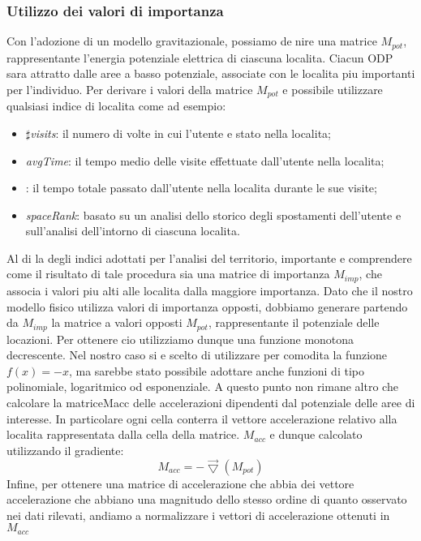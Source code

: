 \subsubsection{Utilizzo dei valori di importanza}
Con l'adozione di un modello gravitazionale, possiamo denire una matrice
$M_{pot}$, rappresentante l'energia potenziale elettrica di ciascuna localita. Ciacun
ODP sara attratto dalle aree a basso potenziale, associate con le localita piu
importanti per l'individuo.
Per derivare i valori della matrice $M_{pot}$ e possibile utilizzare qualsiasi indice di
localita come ad esempio:
\begin{itemize}
\item $\sharp$\textit{visits}: il numero di volte in cui l'utente e stato nella localita;
\item \textit{avgTime}: il tempo medio delle visite effettuate dall'utente nella localita;
\item {}: il tempo totale passato dall'utente nella localita durante le sue
visite;
\item \textit{spaceRank}: basato su un analisi dello storico degli spostamenti dell'utente
e sull'analisi dell'intorno di ciascuna localita.
\end{itemize}
Al di la degli indici adottati per l'analisi del territorio, importante e comprendere
come il risultato di tale procedura sia una matrice di importanza
$M_{imp}$, che associa i valori piu alti alle localita dalla maggiore importanza. Dato
che il nostro modello fisico utilizza valori di importanza opposti, dobbiamo
generare partendo da $M_{imp}$ la matrice a valori opposti $M_{pot}$, rappresentante il
potenziale delle locazioni. Per ottenere cio utilizziamo dunque una funzione
monotona decrescente. Nel nostro caso si e scelto di utilizzare per comodita
la funzione $f(x)=-x$, ma sarebbe stato possibile adottare anche funzioni di tipo
polinomiale, logaritmico od esponenziale. A questo punto non rimane altro che
calcolare la matriceMacc delle accelerazioni dipendenti dal potenziale delle aree
di interesse. In particolare ogni cella conterra il vettore accelerazione relativo
alla localita rappresentata dalla cella della matrice. $M_{acc}$ e dunque calcolato
utilizzando il gradiente:
\begin{equation}
M_{acc} = - \vec{\bigtriangledown}(M_{pot})
\end{equation}
Infine, per ottenere una matrice di accelerazione che abbia dei vettore accelerazione
che abbiano una magnitudo dello stesso ordine di quanto osservato nei
dati rilevati, andiamo a normalizzare i vettori di accelerazione ottenuti in $M_{acc}$
